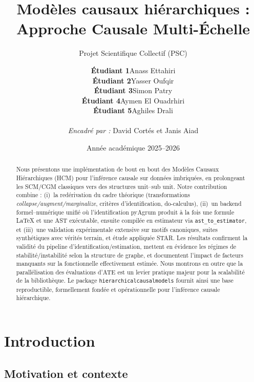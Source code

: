 \documentclass[11pt,a4paper]{article}
\title[PSC -- Modèles causaux hiérarchiques]{Modèles causaux hiérarchiques : Approche Causale Multi-Échelle}
\subtitle{Projet Scientifique Collectif (PSC)}
\author{%
\begin{tabular}{ll}
\textbf{Étudiant 1} & Anass Ettahiri \\[1pt]
\textbf{Étudiant 2} & Yasser Oufqir \\[1pt]
\textbf{Étudiant 3} & Simon Patry \\[1pt]
\textbf{Étudiant 4} & Aymen El Ouadrhiri \\[1pt]
\textbf{Étudiant 5} & Aghiles Drali \\[1pt]
\end{tabular}\\[0.6em]
\textit{Encadré par :} David Cortés et Janis Aiad%
}
\date{Année académique 2025--2026}
\begin{document}
\maketitle

\begin{abstract}
\setlength{\parindent}{0pt}
Nous présentons une implémentation de bout en bout des Modèles Causaux Hiérarchiques (HCM) pour l'inférence causale sur données imbriquées, en prolongeant les SCM/CGM classiques vers des structures unit--sub unit. Notre contribution combine : (i)~la redérivation du cadre théorique (transformations \textit{collapse/augment/marginalize}, critères d'identification, do-calculus), (ii)~un backend formel--numérique unifié où l'identification pyAgrum produit à la fois une formule LaTeX et une AST exécutable, ensuite compilée en estimateur via \texttt{ast\_to\_estimator}, et (iii)~une validation expérimentale extensive sur motifs canoniques, suites synthétiques avec vérités terrain, et étude appliquée STAR. Les résultats confirment la validité du pipeline d'identification/estimation, mettent en évidence les régimes de stabilité/instabilité selon la structure de graphe, et documentent l'impact de facteurs manquants sur la fonctionnelle effectivement estimée. Nous montrons en outre que la parallélisation des évaluations d'ATE est un levier pratique majeur pour la scalabilité de la bibliothèque. Le package \texttt{hierarchicalcausalmodels} fournit ainsi une base reproductible, formellement fondée et opérationnelle pour l'inférence causale hiérarchique.
\end{abstract}

\tableofcontents
\newpage

\section{Introduction}
\label{sec:intro}

\subsection{Motivation et contexte}
\end{document}
